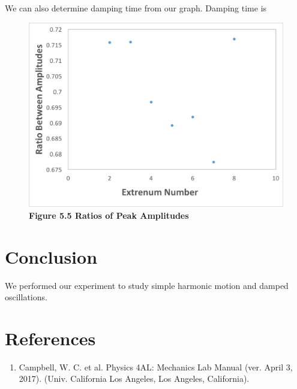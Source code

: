 \documentclass[11pt]{report}
\begin{document}
We can also determine damping time from our graph.  Damping time is 

\begin{figure}
    \includegraphics[width=\linewidth]{Extrenum.png}
    \captionsetup{labelformat=empty}
    \caption{\textbf{Figure 5.5 Ratios of Peak Amplitudes}}
\end{figure}


\section*{Conclusion}
We performed our experiment to study simple harmonic motion and damped
oscillations.  

\newpage
\section*{References}
\begin{enumerate}
    \item Campbell, W. C. et al. Physics 4AL: Mechanics Lab Manual (ver. April
        3, 2017). (Univ. California Los Angeles, Los Angeles, California).
\end{enumerate}
\end{document}
